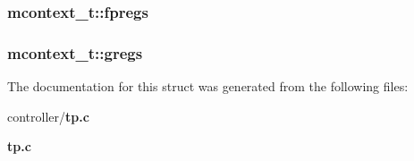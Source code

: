 \subsubsection[{fpregs}]{ {\bf mcontext\_\-t::fpregs}}\label{structmcontext__t_a0f0b81a69567bcabdb83b85412b9b8e5}
\subsubsection[{gregs}]{ {\bf mcontext\_\-t::gregs}}\label{structmcontext__t_a7fbfead90280e2886992435af680d768}


The documentation for this struct was generated from the following files:\begin{DoxyCompactItemize}
\item 
controller/{\bf tp.c}\item 
{\bf tp.c}\end{DoxyCompactItemize}
